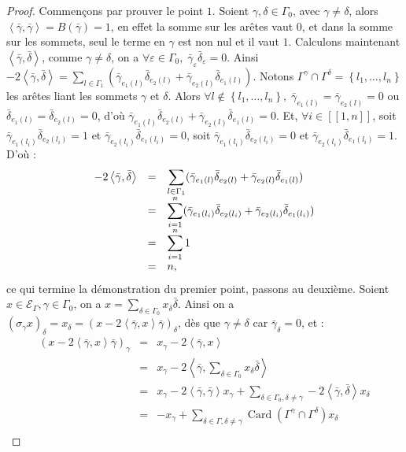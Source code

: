\documentclass[a4paper,11pt]{article}
\DeclareMathOperator{\Card}{Card}
\newcommand{\ps}[2]{\left\langle#1,#2\right\rangle}
\newcommand{\EG}{\mathscr{E}_\Gamma}
\newcommand{\ent}[2]{[\![#1,#2]\!]}
\newcommand{\dps}{\displaystyle}
\begin{document}
		\begin{proof}
			Commençons par prouver le point $1$. Soient $\gamma,\delta\in\Gamma_0$, avec $\gamma\neq\delta$, alors $\ps{\bar\gamma}{\bar\gamma}=B(\bar\gamma)=1$, en effet la somme sur les arêtes vaut 0, et dans la somme sur les sommets, seul le terme en $\gamma$ est non nul et il vaut $1$. Calculons maintenant $\ps{\bar\gamma}{\bar\delta}$, comme $\gamma\neq\delta$, on a $\forall\varepsilon\in\Gamma_0,\;\bar\gamma_\varepsilon\bar\delta_\varepsilon=0$. Ainsi $-2\ps{\bar\gamma}{\bar\delta}=\sum_{l\in\Gamma_1}(\bar\gamma_{e_1(l)}\bar\delta_{e_2(l)}+\bar\gamma_{e_2(l)}\bar\delta_{e_1(l)})$. Notons $\Gamma^\gamma\cap\Gamma^\delta=\left\{ l_1,\dots,l_n \right\}$ les arêtes liant les sommets $\gamma$ et $\delta$. Alors $\forall l\notin\left\{ l_1,\dots,l_n \right\},\;\bar\gamma_{e_1(l)}=\bar\gamma_{e_2(l)}=0$ ou $\bar\delta_{e_1(l)}=\bar\delta_{e_2(l)}=0$, d'où $\bar\gamma_{e_1(l)}\bar\delta_{e_2(l)}+\bar\gamma_{e_2(l)}\bar\delta_{e_1(l)}=0$. Et, $\forall i \in\ent{1}{n}$, soit $\bar\gamma_{e_1(l_i)}\bar\delta_{e_2(l_i)}=1$ et $\bar\gamma_{e_2(l_i)}\bar\delta_{e_1(l_i)}=0$, soit $\bar\gamma_{e_1(l_i)}\bar\delta_{e_2(l_i)}=0$ et $\bar\gamma_{e_2(l_i)}\bar\delta_{e_1(l_i)}=1$. D'où :
			\[
		\begin{array}{>{\dps}r>{\dps}l>{\dps}l}
			-2\ps{\bar\gamma}{\bar\delta}&=& \sum_{l\in\Gamma_1}(\bar\gamma_{e_1(l)}\bar\delta_{e_2(l)}+\bar\gamma_{e_2(l)}\bar\delta_{e_1(l)})\\
			&=& \sum_{i=1}^n(\bar\gamma_{e_1(l_i)}\bar\delta_{e_2(l_i)}+\bar\gamma_{e_2(l_i)}\bar\delta_{e_1(l_i)})\\
			&=& \sum_{i=1}^n 1\\
			&=& n,
		\end{array}
			\]
			ce qui termine la démonstration du premier point, passons au deuxième. Soient $x\in\EG,\gamma\in\Gamma_0$, on a $x=\sum_{\delta\in\Gamma_0}x_\delta\bar\delta$. Ainsi on a $(\sigma_\gamma x)_\delta=x_\delta=(x-2\ps{\bar\gamma}{x}\bar\gamma)_\delta$, dès que $\gamma\neq\delta$ car $\bar\gamma_\delta=0$, et :
		\begin{eqnarray*}
			(x-2\ps{\bar\gamma}{x}\bar\gamma)_{\gamma}&=& x_\gamma-2\ps{\bar\gamma}{x}\\
			&=& x_\gamma-2\ps{\bar\gamma}{\sum_{\delta\in\Gamma_0}x_\delta\bar\delta}\\
			&=& x_\gamma-2\ps{\bar\gamma}{\bar\gamma}x_\gamma+\sum_{\delta\in\Gamma_0,\delta\neq\gamma}-2\ps{\bar\gamma}{\bar\delta}x_\delta\\
			&=& -x_\gamma+\sum_{\delta\in\Gamma,\delta\neq\gamma}\Card(\Gamma^\gamma\cap\Gamma^\delta) x_\delta\\

\end{eqnarray*}
\end{proof}
\end{document}
